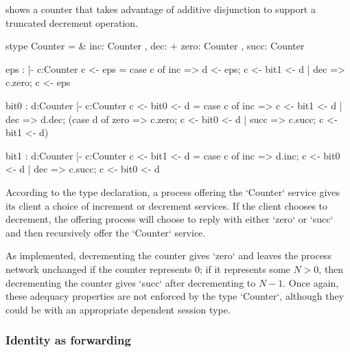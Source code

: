 shows a counter that takes advantage of additive disjunction to support a truncated decrement operation.
%
\begin{sillcode}[
  caption={A binary counter supporting increments and decrements},
  label={lst:counter-inc-dec},
  floatplacement=tb,
  gobble=2
]
  stype Counter = &{ inc: Counter ,
                     dec: +{ zero: Counter , succ: Counter } }
  
  eps : {|- c:Counter}
  c <- eps =
  { case c of
      inc => d <- eps;
             c <- bit1 <- d
    | dec => c.zero;
             c <- eps }
  
  bit0 : {d:Counter |- c:Counter}
  c <- bit0 <- d =
  { case c of
      inc => c <- bit1 <- d
    | dec => d.dec;
             (case d of
                zero => c.zero;
                        c <- bit0 <- d
              | succ => c.succ;
                        c <- bit1 <- d) }
  
  bit1 : {d:Counter |- c:Counter}
  c <- bit1 <- d =
  { case c of
      inc => d.inc;
             c <- bit0 <- d
    | dec => c.succ;
             c <- bit0 <- d }
\end{sillcode}%
%
According to the type declaration, a process offering the \msill`Counter` service gives its client a choice of increment or decrement services.
If the client chooses to decrement, the offering process will choose to reply with either \msill`zero` or \msill`succ` and then recursively offer the \msill`Counter` service.

As implemented, decrementing the counter gives \msill`zero` and leaves the process network unchanged if the counter represents $0$;
if it represents some $N > 0$, then decrementing the counter gives \msill`succ` after decrementing to $N - 1$.
Once again, these adequacy properties are not enforced by the type \msill`Counter`, although they could be with an appropriate dependent session type.

\subsubsection{Identity as forwarding}\label{sec:ident-as-forw}

